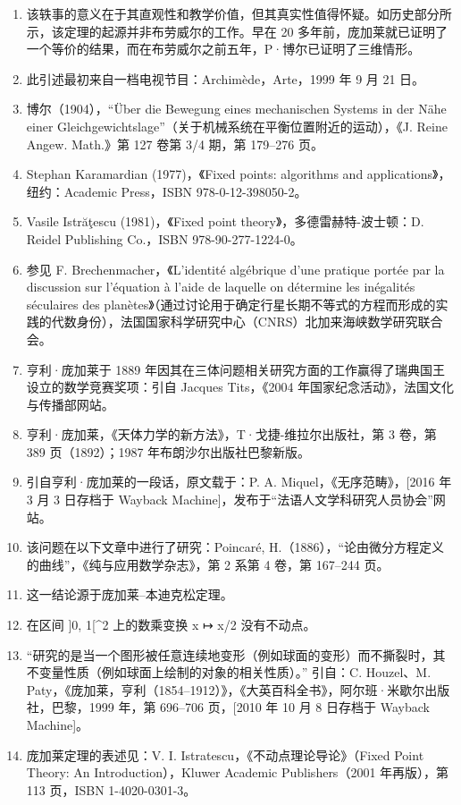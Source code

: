 \begin{enumerate}
\item 该轶事的意义在于其直观性和教学价值，但其真实性值得怀疑。如历史部分所示，该定理的起源并非布劳威尔的工作。早在 20 多年前，庞加莱就已证明了一个等价的结果，而在布劳威尔之前五年，P·博尔已证明了三维情形。
\item 此引述最初来自一档电视节目：Archimède，Arte，1999 年 9 月 21 日。
\item 博尔（1904），“Über die Bewegung eines mechanischen Systems in der Nähe einer Gleichgewichtslage”（关于机械系统在平衡位置附近的运动），《J. Reine Angew. Math.》第 127 卷第 3/4 期，第 179–276 页。
\item Stephan Karamardian (1977)，《Fixed points: algorithms and applications》，纽约：Academic Press，ISBN 978-0-12-398050-2。
\item Vasile Istrăţescu (1981)，《Fixed point theory》，多德雷赫特-波士顿：D. Reidel Publishing Co.，ISBN 978-90-277-1224-0。
\item 参见 F. Brechenmacher，《L'identité algébrique d'une pratique portée par la discussion sur l'équation à l'aide de laquelle on détermine les inégalités séculaires des planètes》（通过讨论用于确定行星长期不等式的方程而形成的实践的代数身份），法国国家科学研究中心（CNRS）北加来海峡数学研究联合会。
\item 亨利·庞加莱于 1889 年因其在三体问题相关研究方面的工作赢得了瑞典国王设立的数学竞赛奖项：引自 Jacques Tits，《2004 年国家纪念活动》，法国文化与传播部网站。
\item 亨利·庞加莱，《天体力学的新方法》，T·戈捷-维拉尔出版社，第 3 卷，第 389 页（1892）；1987 年布朗沙尔出版社巴黎新版。
\item 引自亨利·庞加莱的一段话，原文载于：P. A. Miquel，《无序范畴》，[2016 年 3 月 3 日存档于 Wayback Machine]，发布于“法语人文学科研究人员协会”网站。
\item 该问题在以下文章中进行了研究：Poincaré, H.（1886），“论由微分方程定义的曲线”，《纯与应用数学杂志》，第 2 系第 4 卷，第 167–244 页。
\item 这一结论源于庞加莱–本迪克松定理。
\item  在区间 ]0, 1[^2 上的数乘变换 x ↦ x/2 没有不动点。
\item “研究的是当一个图形被任意连续地变形（例如球面的变形）而不撕裂时，其不变量性质（例如球面上绘制的对象的相关性质）。” 引自：C. Houzel、M. Paty，《庞加莱，亨利（1854–1912）》，《大英百科全书》，阿尔班·米歇尔出版社，巴黎，1999 年，第 696–706 页，[2010 年 10 月 8 日存档于 Wayback Machine]。
\item 庞加莱定理的表述见：V. I. Istratescu，《不动点理论导论》（Fixed Point Theory: An Introduction），Kluwer Academic Publishers（2001 年再版），第 113 页，ISBN 1-4020-0301-3。

\end{enumerate}
